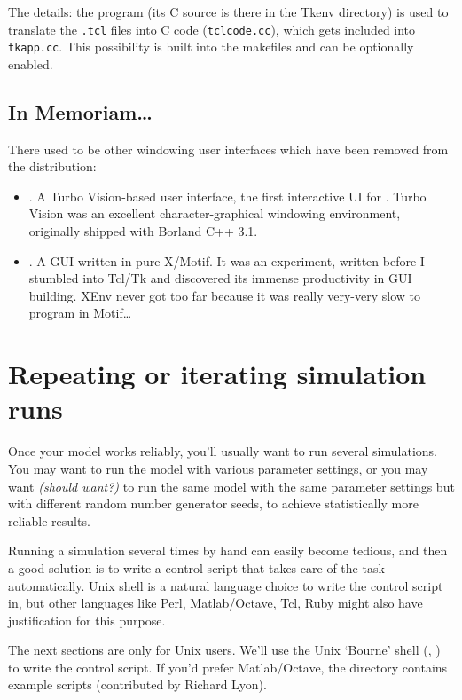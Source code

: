 The details: the  program (its C source is there in the
Tkenv directory) is used to translate the \texttt{.tcl} files into C
code (\texttt{tclcode.cc}), which gets included into
\texttt{tkapp.cc}. This possibility is built into the makefiles
and can be optionally enabled.

\subsection{In Memoriam\dots }

There used to be other windowing user interfaces which have been removed
from the distribution:

\begin{itemize}
  \item {}. A Turbo Vision-based user interface, the first
    interactive UI for {\opp}. Turbo Vision was an excellent
    character-graphical windowing environment, originally shipped with
    Borland C++ 3.1.
  \item {}. A GUI written in pure X/Motif. It was an
    experiment, written before I stumbled into Tcl/Tk and discovered
    its immense productivity in GUI building. XEnv never got too far
    because it was really very-very slow to program in Motif\dots
\end{itemize}


\section{Repeating or iterating simulation runs}

Once your model works reliably, you'll usually want to run several
simulations. You may want to run the model with various
parameter settings, or you may want \textit{(should want?)} to
run the same model with the same parameter settings but with
different random number generator seeds, to achieve statistically
more reliable results.

Running a simulation several times by hand can easily become tedious,
and then a good solution is to write a control script that
takes care of the task automatically. Unix shell is
a natural language choice to write the control script in,
but other languages like Perl, Matlab/Octave, Tcl, Ruby might also have
justification for this purpose.

The next sections are only for Unix users. We'll use the
Unix `Bourne' shell (, ) to write the control script.
If you'd prefer Matlab/Octave, the  directory
contains example scripts (contributed by Richard Lyon).


